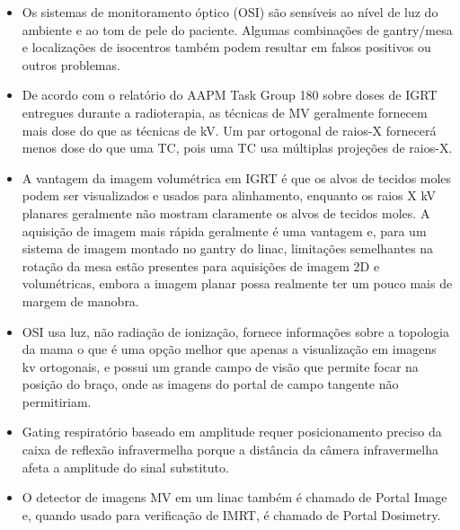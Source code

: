 \documentclass[11pt,a4paper]{article}
\newcounter{exemplo}
\begin{document}
\begin{exemplo}[Imagens]
\begin{itemize}
        \item Os sistemas de monitoramento óptico (OSI) são sensíveis ao nível de luz do ambiente e ao tom de pele do paciente. Algumas combinações de gantry/mesa e localizações de isocentros também podem resultar em falsos positivos ou outros problemas.
        
        \item De acordo com o relatório do AAPM Task Group 180 sobre doses de IGRT entregues durante a radioterapia, as técnicas de MV geralmente fornecem mais dose do que as técnicas de kV. Um par ortogonal de raios-X fornecerá menos dose do que uma TC, pois uma TC usa múltiplas projeções de raios-X.
        
        \item A vantagem da imagem volumétrica em IGRT é que os alvos de tecidos moles podem ser visualizados e usados para alinhamento, enquanto os raios X kV planares geralmente não mostram claramente os alvos de tecidos moles. A aquisição de imagem mais rápida geralmente é uma vantagem e, para um sistema de imagem montado no gantry do linac, limitações semelhantes na rotação da mesa estão presentes para aquisições de imagem 2D e volumétricas, embora a imagem planar possa realmente ter um pouco mais de margem de manobra.
        
        \item OSI usa luz, não radiação de ionização, fornece informações sobre a topologia da mama o que é uma opção melhor que apenas a visualização em imagens kv ortogonais, e possui um grande campo de visão que permite focar na posição do braço, onde as imagens do portal de campo tangente não permitiriam.
        
        \item Gating respiratório baseado em amplitude requer posicionamento preciso da caixa de reflexão infravermelha porque a distância da câmera infravermelha afeta a amplitude do sinal substituto.

        \item O detector de imagens MV em um linac também é chamado de Portal Image e, quando usado para verificação de IMRT, é chamado de Portal Dosimetry.



    \end{itemize}
\end{exemplo}
\end{document}
